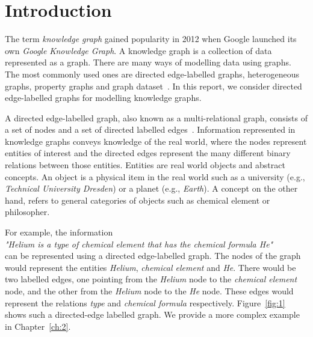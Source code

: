 \chapter{Introduction}
\label{ch:1}
The term \textit{knowledge graph} gained popularity in 2012 when Google launched its own \textit{Google Knowledge Graph}. A knowledge graph is a collection of data represented as a graph. There are many ways of modelling data using graphs. The most commonly used ones are directed edge-labelled graphs, heterogeneous graphs, property graphs and graph dataset~\cite{Hogan2021}. In this report, we consider directed edge-labelled graphs for modelling knowledge graphs.

A directed edge-labelled graph, also known as a multi-relational graph, consists of a set of nodes and a set of directed labelled edges~\cite{Hogan2021}. Information represented in knowledge graphs conveys knowledge of the real world, where the nodes represent entities of interest and the directed edges represent the many different binary relations between those entities. Entities are real world objects and abstract concepts. An object is a physical item in the real world such as a university (e.g., \textit{Technical University Dresden}) or a planet (e.g., \textit{Earth}). A concept on the other hand, refers to general categories of objects such as chemical element or philosopher. 

For example, the information \\
\hspace*{0.25cm} \textit{"Helium is a type of chemical element that has the chemical formula He"} \\
can be represented using a directed edge-labelled graph. The nodes of the graph would represent the entities \textit{Helium}, \textit{chemical element} and \textit{He}. There would be two labelled edges, one pointing from the \textit{Helium} node to the \textit{chemical element} node, and the other from the \textit{Helium} node to the \textit{He} node. These edges would represent the relations \textit{type} and \textit{chemical formula} respectively. Figure~\ref{fig:1} shows such a directed-edge labelled graph. We provide a more complex example in Chapter~\ref{ch:2}.

